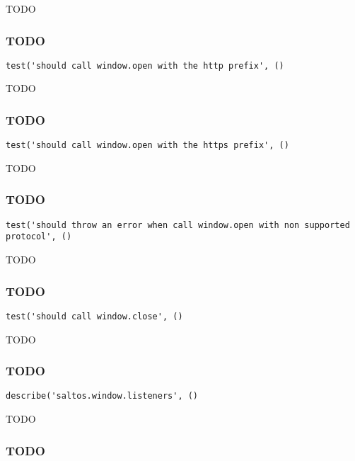 \documentclass[a4paper]{article}
\begin{document}
TODO

\hypertarget{toc729}{}
\subsubsection{TODO}

\begin{lstlisting}
test('should call window.open with the http prefix', ()
\end{lstlisting}

TODO

\hypertarget{toc730}{}
\subsubsection{TODO}

\begin{lstlisting}
test('should call window.open with the https prefix', ()
\end{lstlisting}

TODO

\hypertarget{toc731}{}
\subsubsection{TODO}

\begin{lstlisting}
test('should throw an error when call window.open with non supported protocol', ()
\end{lstlisting}

TODO

\hypertarget{toc732}{}
\subsubsection{TODO}

\begin{lstlisting}
test('should call window.close', ()
\end{lstlisting}

TODO

\hypertarget{toc733}{}
\subsubsection{TODO}

\begin{lstlisting}
describe('saltos.window.listeners', ()
\end{lstlisting}

TODO

\hypertarget{toc734}{}
\subsubsection{TODO}
\end{document}
